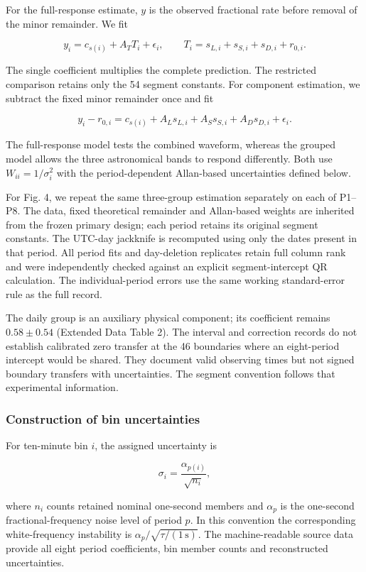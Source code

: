 \documentclass[
  12pt,
  a4paper,
]{article}
\begin{document}
For the full-response estimate, \(y\) is the observed fractional rate
before removal of the minor remainder. We fit

\[y_i=c_{s(i)}+A_TT_i+\epsilon_i,\qquad T_i=s_{L,i}+s_{S,i}+s_{D,i}+r_{0,i}.\]

The single coefficient multiplies the complete prediction. The
restricted comparison retains only the 54 segment constants. For
component estimation, we subtract the fixed minor remainder once and fit

\[y_i-r_{0,i}=c_{s(i)}+A_Ls_{L,i}+A_Ss_{S,i}+A_Ds_{D,i}+\epsilon_i.\]

The full-response model tests the combined waveform, whereas the grouped
model allows the three astronomical bands to respond differently. Both
use \(W_{ii}=1/\sigma_i^2\) with the period-dependent Allan-based
uncertainties defined below.

For Fig. 4, we repeat the same three-group estimation separately on each
of P1--P8. The data, fixed theoretical remainder and Allan-based weights
are inherited from the frozen primary design; each period retains its
original segment constants. The UTC-day jackknife is recomputed using
only the dates present in that period. All period fits and day-deletion
replicates retain full column rank and were independently checked
against an explicit segment-intercept QR calculation. The
individual-period errors use the same working standard-error rule as the
full record.

The daily group is an auxiliary physical component; its coefficient
remains \(0.58\pm0.54\) (Extended Data Table 2). The interval and
correction records do not establish calibrated zero transfer at the 46
boundaries where an eight-period intercept would be shared. They
document valid observing times but not signed boundary transfers with
uncertainties. The segment convention follows that experimental
information.

\hypertarget{construction-of-bin-uncertainties}{%
\subsubsection{Construction of bin
uncertainties}\label{construction-of-bin-uncertainties}}

For ten-minute bin \(i\), the assigned uncertainty is

\[\sigma_i=\frac{\alpha_{p(i)}}{\sqrt{n_i}},\]

where \(n_i\) counts retained nominal one-second members and
\(\alpha_p\) is the one-second fractional-frequency noise level of
period \(p\). In this convention the corresponding white-frequency
instability is \(\alpha_p/\sqrt{\tau/(1\,\mathrm{s})}\). The
machine-readable source data provide all eight period coefficients, bin
member counts and reconstructed uncertainties.
\end{document}
